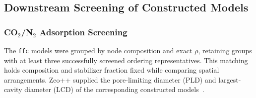 \documentclass[a5paper, 10pt]{article}
\begin{document}
\subsection{Downstream Screening of Constructed Models}
\label{sec:screening}
\subsubsection{\texorpdfstring{CO$_2$/N$_2$ Adsorption Screening}{CO2/N2 Adsorption Screening}}

The \texttt{ffc} models were grouped by node composition and exact $\rho$, retaining groups with at least three successfully screened ordering representatives. This matching holds composition and stabilizer fraction fixed while comparing spatial arrangements. Zeo++ supplied the pore-limiting diameter (PLD) and largest-cavity diameter (LCD) of the corresponding constructed models~\cite{willems2012algorithms}.
\end{document}
